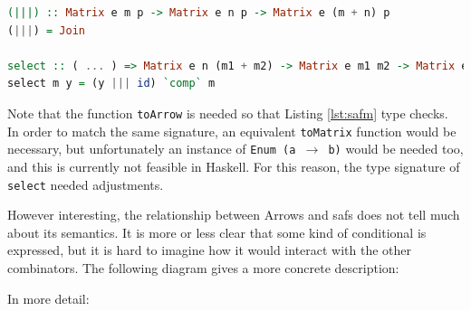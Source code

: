 \documentclass[
  oneside,
  11pt, a4paper,
  footinclude=true,
  headinclude=true,
  cleardoublepage=empty
]{scrbook}
\theoremstyle{definition}
\theoremstyle{definition}
\begin{document}
        \begin{lstlisting}[language=Haskell, label={lst:safm2}, caption={LAoP Selective instance},captionpos=b]
(|||) :: Matrix e m p -> Matrix e n p -> Matrix e (m + n) p
(|||) = Join

select :: ( ... ) => Matrix e n (m1 + m2) -> Matrix e m1 m2 -> Matrix e n m2
select m y = (y ||| id) `comp` m
        \end{lstlisting}{}
        
        Note that the function \texttt{toArrow} is needed so that Listing \ref{lst:safm} type checks. In order to match the same signature, an equivalent \texttt{toMatrix} function would be necessary, but unfortunately an instance of \texttt{Enum (a $\rightarrow$ b)} would be needed too, and this is currently not feasible in Haskell. For this reason, the type signature of \texttt{select} needed adjustments.
        
        However interesting, the relationship between Arrows and \glspl{saf} does not tell much about its semantics. It is more or less clear that some kind of conditional is expressed, but it is hard to imagine how it would interact with the other combinators. The following diagram gives a more concrete description:
        \vskip0.2cm
        
        \begin{center}
        \end{center}
        
        In more detail:
        
        \begin{center}
        \end{center}{}
        
\end{document}
